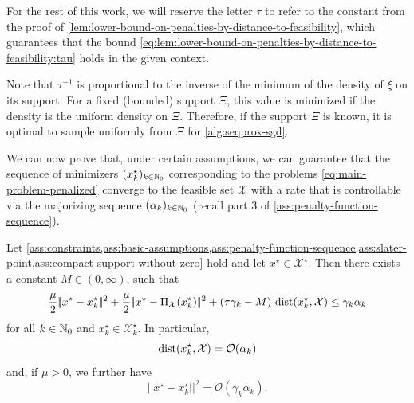\begin{notation}
    For the rest of this work, we will reserve the letter $\tau$ to refer to the constant
    from the proof of \cref{lem:lower-bound-on-penalties-by-distance-to-feasibility},
    which guarantees that the bound \eqref{eq:lem:lower-bound-on-penalties-by-distance-to-feasibility:tau}
    holds in the given context.
\end{notation}
Note that $\tau^{-1}$ is proportional to the inverse of the minimum of the density
of $\xi$ on its support. For a fixed (bounded) support $\Xi$, this value is minimized if
the density is the uniform density on $\Xi$. Therefore, if the support $\Xi$ is known, it
is optimal to sample uniformly from $\Xi$ for \cref{alg:seqprox-sgd}.

We can now prove that, under certain assumptions, we can guarantee that the sequence of minimizers
$(x_k^\star)_{k\in\mathbb{N}_0}$ corresponding to the problems \eqref{eq:main-problem-penalized} converge
to the feasible set $\mathcal{X}$ with a rate that is controllable via the majorizing sequence
$(\alpha_k)_{k\in\mathbb{N}_0}$ (recall part 3 of \cref{ass:penalty-function-sequence}).
\begin{theorem}
    \label{thm:distance-to-feasibility-bound}
    Let \cref{ass:constraints,ass:basic-assumptions,ass:penalty-function-sequence,ass:slater-point,ass:compact-support-without-zero} hold
    and let $x^\star\in\mathcal{X}^\star$.
    Then there exists a constant $M\in (0,\infty)$, such that
    \[
        \frac{\mu}{2} |\!|x^\star - x_k^\star|\!|^2 + \frac{\mu}{2} |\!|x^\star - \operatorname{\Pi_\mathcal{X}}(x_k^\star)|\!|^2
        + (\tau\gamma_k - M) \, \operatorname{dist}(x_k^\star, \mathcal{X})
        \leq
        \gamma_k \alpha_k
    \]
    for all $k\in\mathbb{N}_0$ and $x_k^\star\in\mathcal{X}^\star_k$.
    In particular,
    \[
        \operatorname{dist}(x_k^\star, \mathcal{X}) = \mathcal{O}(\alpha_k)
    \]
    and, if $\mu > 0$, we further have
    \[
        |\!|x^\star - x_k^\star|\!|^2 = \mathcal{O}(\gamma_k \alpha_k).
    \]
\end{theorem}
